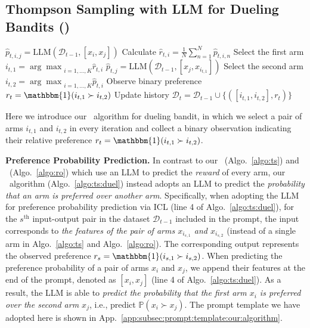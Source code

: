\subsection{Thompson Sampling with LLM for Dueling Bandits (\algtsduel)}
\label{subsec:algo:ts:duel}
\begin{algorithm}[h]
\begin{algorithmic}[1]
                    \STATE $\widehat{p}_{t,i,j} = \text{LLM}(\mathcal{D}_{t-1}, [x_i, x_j])$
                \ENDFOR
            \STATE    Calculate $\widehat{r}_{t,i} = \frac{1}{N}\sum^N_{n=1}\widehat{p}_{t,i,n}$
            \ENDFOR
            \STATE Select the first arm $i_{t,1} = {\arg\max}_{i=1,\ldots,K}\widehat{r}_{t,i}$
                \STATE $\widehat{p}_{t,j} = \text{LLM}(\mathcal{D}_{t-1}, [x_j, x_{i_{t,1}}])$ 
            \ENDFOR
            \STATE Select the second arm $i_{t,2} = {\arg\max}_{i=1,\ldots,K}\widehat{p}_{t,i}$
            \STATE Observe binary preference $r_t = \mathbbm{1}(i_{t,1} \succ i_{t,2})$
            \STATE Update history $\mathcal{D}_t = \mathcal{D}_{t-1} \cup \{([i_{t,1}, i_{t,2}],r_t)\}$
        \ENDFOR
\end{algorithmic}
\caption{\algtsduel}
\label{algo:ts:duel}
\end{algorithm}
Here we introduce our \algtsduel~algorithm 
for dueling bandit,
in which we select a pair of arms $i_{t,1}$ and $i_{t,2}$ in every iteration and collect a binary observation indicating their relative preference $r_t = \mathbbm{1}(i_{t,1} \succ i_{t,2})$.

\textbf{Preference Probability Prediction.}
In contrast to our \algts~(Algo.~\ref{algo:ts}) and \algro~(Algo.~\ref{algo:ro}) which use an LLM to predict the \emph{reward} of every arm, our \algtsduel~algorithm (Algo.~\ref{algo:ts:duel}) instead adopts an LLM to predict the \emph{probability that an arm is preferred over another arm}.
Specifically, when adopting the LLM for preference probability prediction via ICL (line 4 of Algo.~\ref{algo:ts:duel}), for the $s^{\text{th}}$ input-output pair in the dataset $\mathcal{D}_{t-1}$ included in the prompt, the input corresponds to \emph{the features of the pair of arms $x_{i_{s,1}}$ and $x_{i_{s,2}}$} (instead of a single arm in Algo.~\ref{algo:ts} and Algo.~\ref{algo:ro}).
The corresponding output represents the observed preference $r_s = \mathbbm{1}(i_{s,1} \succ i_{s,2})$.
When predicting the preference probability of a pair of arms $x_i$ and $x_j$, we append their features at the end of the prompt, denoted as $[x_i,x_j]$ (line 4 of Algo.~\ref{algo:ts:duel}).
As a result, the LLM is able to \emph{predict the probability that the first arm $x_i$ is preferred over the second arm $x_j$}, i.e., predict $\mathbb{P}(x_i \succ x_j)$.
The prompt template we have adopted here is shown in 
App.~\ref{app:subsec:prompt:template:our:algorithm}.

